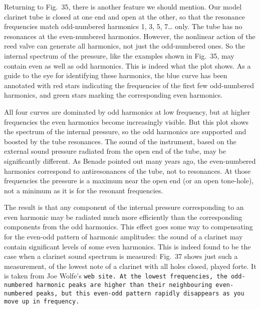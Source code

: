 
\audio{}

  Returning to Fig.\ 35, there is another feature we should mention. Our model 
  clarinet tube is closed at one end and open at the other, so that the 
  resonance frequencies match odd-numbered harmonics 1, 3, 5, 7… only. The tube 
  has no resonances at the even-numbered harmonics. However, the nonlinear 
  action of the reed valve can generate all harmonics, not just the 
  odd-numbered ones. So the internal spectrum of the pressure, like the 
  examples shown in Fig.\ 35, may contain even as well as odd harmonics. This 
  is indeed what the plot shows. As a guide to the eye for identifying these 
  harmonics, the blue curve has been annotated with red stars indicating the 
  frequencies of the first few odd-numbered harmonics, and green stars marking 
  the corresponding even harmonics. 

  All four curves are dominated by odd harmonics at low frequency, but at 
  higher frequencies the even harmonics become increasingly visible. But this 
  plot shows the spectrum of the internal pressure, so the odd harmonics are 
  supported and boosted by the tube resonances. The sound of the instrument, 
  based on the external sound pressure radiated from the open end of the tube, 
  may be significantly different. As Benade pointed out many years ago, the 
  even-numbered harmonics correspond to antiresonances of the tube, not to 
  resonances. At those frequencies the pressure is a maximum near the open end 
  (or an open tone-hole), not a minimum as it is for the resonant frequencies. 

  The result is that any component of the internal pressure corresponding to an 
  even harmonic may be radiated much more efficiently than the corresponding 
  components from the odd harmonics. This effect goes some way to compensating 
  for the even-odd pattern of harmonic amplitudes: the sound of a clarinet may 
  contain significant levels of some even harmonics. This is indeed found to be 
  the case when a clarinet sound spectrum is measured: Fig.\ 37 shows just such 
  a measurement, of the lowest note of a clarinet with all holes closed, played 
  forte. It is taken from Joe Wolfe's \tt{}web site\rm{}. At the lowest 
  frequencies, the odd-numbered harmonic peaks are higher than their 
  neighbouring even-numbered peaks, but this even-odd pattern rapidly 
  disappears as you move up in frequency. 

